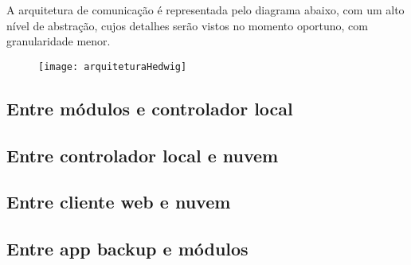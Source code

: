 A arquitetura de comunicação é representada pelo diagrama abaixo, com um alto nível de abstração, cujos detalhes serão vistos no momento oportuno, com granularidade menor.


\begin{figure}[H]
	\centering
	\caption{}
  \texttt{[image: arquiteturaHedwig]}
\label{fig:diagramaComunicacao}
\end{figure}

\subsection{Entre módulos e controlador local}
\subsection{Entre controlador local e nuvem}
\subsection{Entre cliente web e nuvem}
\subsection{Entre app backup e módulos}
